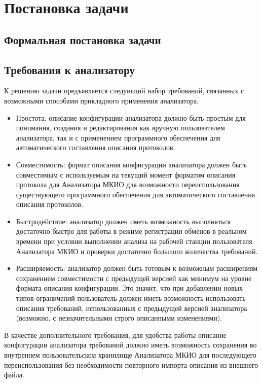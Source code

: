 \section{Постановка задачи}

\subsection{Формальная постановка задачи}



\subsection{Требования к анализатору}

К решению задачи предъявляется следующий набор требований, связанных с 
возможными способами прикладного применения анализатора.

\begin{itemize}
 \item Простота: описание конфигурации анализатора должно быть простым для 
понимания, создания и редактирования как вручную пользователем анализатора, так 
и с применением программного обеспечения для автоматического составления 
описания протоколов.
 \item Совместимость: формат описания конфигурации анализатора должен быть 
совместимым с 
используемым на текущий момент форматом описания протокола для Анализатора 
МКИО для возможности переиспользования существующего программного обеспечения 
для автоматического составления описания протоколов.
 \item Быстродействие: анализатор должен иметь возможность выполняться 
достаточно быстро для работы в режиме регистрации обменов в реальном времени при 
условии выполнении анализа на рабочей станции пользователя Анализатора МКИО и 
проверки достаточно большого количества требований.
 \item Расширяемость: анализатор должен быть готовым к возможным расширениям 
сохранением совместимости с предыдущей версией как минимум на уровне формата 
описания конфигурации. Это значит, что при добавлении новых типов ограничений 
пользователь должен иметь возможность использовать описания требований, 
использованных с предыдущей версией анализатора (возможно, с незначительными 
строго описанными изменениями).
\end{itemize}

В качестве дополнительного требования, для удобства работы описание 
конфигурации анализатора требований должно иметь возможность сохранения во 
внутреннем пользовательском хранилище Анализатора МКИО для последующего 
переиспользования без необходимости повторного импорта описания из внешнего 
файла.

